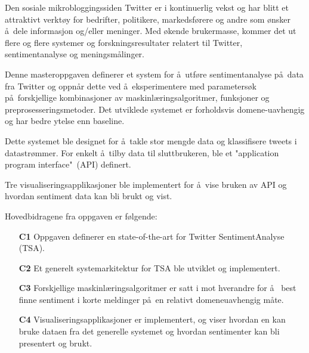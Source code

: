 Den sosiale mikrobloggingssiden Twitter er i kontinuerlig vekst og har blitt et attraktivt verkt\o y for bedrifter, politikere, markedsf\o rere og andre som \o nsker \aa~dele informasjon og/eller meninger. Med \o kende brukermasse, kommer det ut flere og flere systemer og forskningsresultater relatert til Twitter, sentimentanalyse og meningsm\aa linger.

Denne masteroppgaven definerer et system for \aa~utf\o re sentimentanalyse p\aa~data fra Twitter og oppn\aa r dette ved \aa~eksperimentere med parameters\o k p\aa~forskjellige kombinasjoner av maskinl\ae ringsalgoritmer, funksjoner og preprosesseringsmetoder. Det utviklede systemet er forholdsvis domene-uavhengig og har bedre ytelse enn baseline.

Dette systemet ble designet for \aa~takle stor mengde data og klassifisere tweets i datastr\o mmer. For enkelt \aa~tilby data til sluttbrukeren, ble et "application program interface"~(API) definert.

Tre visualiseringsapplikasjoner ble implementert for \aa~vise bruken av API og hvordan sentiment data kan bli brukt og vist.

Hovedbidragene fra oppgaven er f\o lgende:

\begin{itemize}
\item[\textbf{C1}] Oppgaven definerer en state-of-the-art for Twitter SentimentAnalyse (TSA).

\item[\textbf{C2}] Et generelt systemarkitektur for TSA ble utviklet og implementert.

\item[\textbf{C3}] Forskjellige maskinl\ae ringsalgoritmer er satt i mot hverandre for \aa~ best finne sentiment i korte meldinger p\aa~en relativt domeneuavhengig m\aa te.

\item[\textbf{C4}] Visualiseringsapplikasjoner er implementert, og viser hvordan en kan bruke dataen fra det generelle systemet og hvordan sentimenter kan bli presentert og brukt.
\end{itemize}

\clearpage